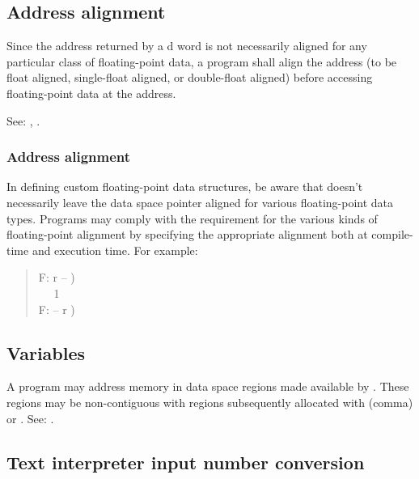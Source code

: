 \subsection{Address alignment} %

Since the address returned by a d word is not
necessarily aligned for any particular class of floating-point
data, a program shall align the address (to be float aligned,
single-float aligned, or double-float aligned) before accessing
floating-point data at the address.

See: ,
.

\begin{info}
\subsubsection{Address alignment} %

In defining custom floating-point data structures, be aware that
 doesn't necessarily leave the data space pointer
aligned for various floating-point data types. Programs may comply
with the requirement for the various kinds of floating-point alignment
by specifying the appropriate alignment both at compile-time and
execution time. For example:

\begin{quote}\ttfamily
	\word[core]{:}   F: r -- ) \\
	\tab {}  ~~
		1   ~ \\
	\tab {}  F: -- r )
		~  \word[core]{;}
\end{quote}
\end{info}

\subsection{Variables} %

A program may address memory in data space regions made available
by . These regions may be non-contiguous with
regions subsequently allocated with \word[core]{,} (comma) or
. See: .

\subsection{Text interpreter input number conversion} %
\label{float:conv}

